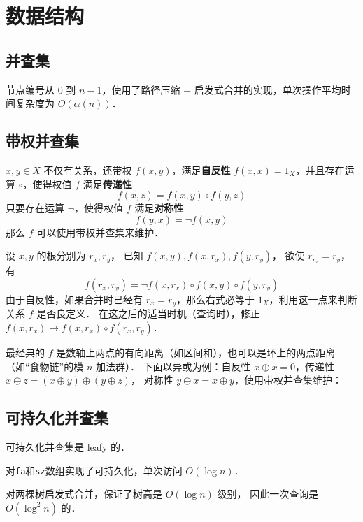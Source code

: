 \section{数据结构}

\subsection{并查集}

节点编号从 $0$ 到 $n - 1$，使用了路径压缩 + 启发式合并的实现，单次操作平均时间复杂度为 $O(\alpha(n))$．



\subsection{带权并查集}

$x, y \in X$ 不仅有关系，还带权 $f(x, y)$，满足{\bf 自反性} $f(x, x) = 1_X$，并且存在运算 $\circ$，使得权值 $f$ 满足{\bf 传递性}
$$
f(x, z) = f(x, y) \circ f(y, z)
$$
只要存在运算 $\neg$，使得权值 $f$ 满足{\bf 对称性}
$$
f(y, x) = \neg f(x, y)
$$
那么 $f$ 可以使用带权并查集来维护．

设 $x, y$ 的根分别为 $r_x, r_y$，
已知 $f(x, y), f(x, r_x), f(y, r_y)$，
欲使 $r_{r_x} = r_y$，有
$$
f(r_x, r_y) = \neg f(x, r_x) \circ f(x, y) \circ f(y, r_y)
$$
由于自反性，如果合并时已经有 $r_x = r_y$，那么右式必等于 $1_X$，利用这一点来判断关系 $f$ 是否良定义．
在这之后的适当时机（查询时），修正 $f(x, r_x) \mapsto f(x, r_x) \circ f(r_x, r_y)$．

最经典的 $f$ 是数轴上两点的有向距离（如区间和），也可以是环上的两点距离（如“食物链”的模 $n$ 加法群）．
下面以异或为例：自反性 $x \oplus x = 0$，传递性 $x \oplus z = (x \oplus y) \oplus (y \oplus z)$，
对称性 $y \oplus x = x \oplus y$，使用带权并查集维护：

\newpage



\subsection{可持久化并查集}

可持久化并查集是 leafy 的．

对{\tt fa}和{\tt sz}数组实现了可持久化，单次访问 $O(\log n)$．

对两棵树启发式合并，保证了树高是 $O(\log n)$ 级别，
因此一次查询是 $O(\log^2 n)$ 的．

